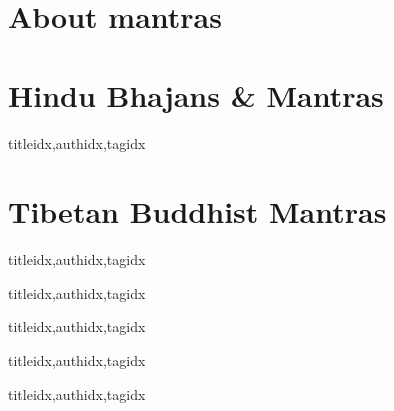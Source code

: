 \documentclass[twoside,10pt]{book}
\begin{document}
     \section{About mantras}
       
     \clearpage\scleardpage
    \section{Hindu Bhajans \& Mantras}
      \begin{songs}{titleidx,authidx,tagidx}
        \setcounter{songnum}{100}
        
      \end{songs}
     \scleardpage
    \section{Tibetan Buddhist Mantras}
      \begin{songs}{titleidx,authidx,tagidx}
        \setcounter{songnum}{150}
        
      \end{songs}

  \clearpage\scleardpage
    \begin{songs}{titleidx,authidx,tagidx}
      \setcounter{songnum}{200}
      
    \end{songs}

  \clearpage\scleardpage
    \begin{songs}{titleidx,authidx,tagidx}
      \setcounter{songnum}{300}
      
    \end{songs}

  \clearpage\scleardpage
    \begin{songs}{titleidx,authidx,tagidx}
      \setcounter{songnum}{400}
      
    \end{songs}

  \clearpage\scleardpage
    \begin{songs}{titleidx,authidx,tagidx}
      \setcounter{songnum}{700}
      
    \end{songs}
\end{document}

